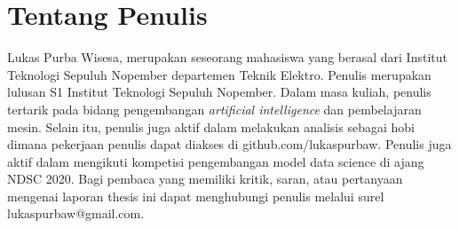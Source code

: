 \section*{Tentang Penulis}
Lukas Purba Wisesa, merupakan seseorang mahasiswa yang 
berasal dari Institut Teknologi Sepuluh Nopember departemen Teknik Elektro. Penulis merupakan lulusan S1 Institut 
Teknologi Sepuluh Nopember. Dalam masa kuliah, penulis tertarik pada bidang pengembangan \textit{artificial 
intelligence}  dan pembelajaran mesin. Selain itu, penulis juga aktif dalam melakukan analisis sebagai hobi 
dimana pekerjaan penulis dapat diakses di github.com/lukaspurbaw. Penulis juga aktif dalam mengikuti kompetisi 
pengembangan model data science di ajang NDSC 2020. Bagi pembaca yang memiliki kritik, saran, atau pertanyaan 
mengenai laporan thesis ini dapat menghubungi penulis melalui surel lukaspurbaw@gmail.com.